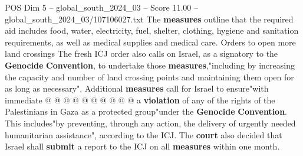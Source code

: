 \begin{textsample}{POS Dim 5 – global\_south\_2024\_03 – Score 11.00 – global\_south\_2024\_03/107106027.txt}
The \textbf{measures} outline that the required aid includes food, water, electricity, fuel, shelter, clothing, hygiene and sanitation requirements, as well as medical supplies and medical care.
Orders to open more land crossings The fresh ICJ order also calls on Israel, as a signatory to the \textbf{Genocide} \textbf{Convention}, to undertake those \textbf{measures},"including by increasing the capacity and number of land crossing points and maintaining them open for as long as necessary".
Additional \textbf{measures} call for Israel to ensure"with immediate @ @ @ @ @ @ @ @ @ @ a \textbf{violation} of any of the rights of the Palestinians in Gaza as a protected group"under the \textbf{Genocide} \textbf{Convention}.
This includes"by preventing, through any action, the delivery of urgently needed humanitarian assistance", according to the ICJ.
The \textbf{court} also decided that Israel shall \textbf{submit} a report to the ICJ on all \textbf{measures} within one month.

\end{textsample}
